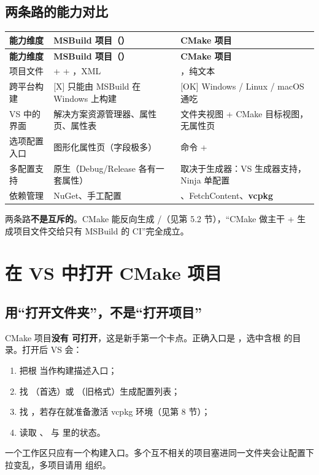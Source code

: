 \subsection{两条路的能力对比}
\begin{longtable}{L{2.6cm}L{5.6cm}L{6.4cm}}
\toprule \textbf{能力维度} & \textbf{MSBuild 项目（）} & \textbf{CMake 项目} \\ \midrule
\endfirsthead
\toprule \textbf{能力维度} & \textbf{MSBuild 项目（）} & \textbf{CMake 项目} \\ \midrule
\endhead
\bottomrule \endlastfoot
项目文件 &  +  + ，XML & ，纯文本 \\
跨平台构建 & [X] 只能由 MSBuild 在 Windows 上构建 & [OK] Windows / Linux / macOS 通吃 \\
VS 中的界面 & 解决方案资源管理器、属性页、属性表 & 文件夹视图 + CMake 目标视图，无属性页 \\
选项配置入口 & 图形化属性页（字段极多） &  命令 +  \\
多配置支持 & 原生（Debug/Release 各有一套属性） & 取决于生成器：VS 生成器支持，Ninja 单配置 \\
依赖管理 & NuGet、手工配置 & 、FetchContent、\textbf{vcpkg} \\
\end{longtable}
\begin{warnbox}[注意]
两条路\textbf{不是互斥的}。CMake 能反向生成 /（见第 5.2 节），“CMake 做主干 + 生成项目文件交给只有 MSBuild 的 CI”完全成立。
\end{warnbox}

\section{在 VS 中打开 CMake 项目}
\subsection{用“打开文件夹”，不是“打开项目”}
CMake 项目\textbf{没有  可打开}，这是新手第一个卡点。正确入口是 ，选中含根  的目录。打开后 VS 会：
\begin{enumerate}
  \item 把根  当作构建描述入口；
  \item 找 \textbf{}（首选）或 \textbf{}（旧格式）生成配置列表；
  \item 找 \textbf{}，若存在就准备激活 vcpkg 环境（见第 8 节）；
  \item 读取 、 与  里的状态。
\end{enumerate}
\begin{tipbox}[提示]
一个工作区只应有一个构建入口。多个互不相关的项目塞进同一文件夹会让配置下拉变乱，多项目请用  组织。
\end{tipbox}

